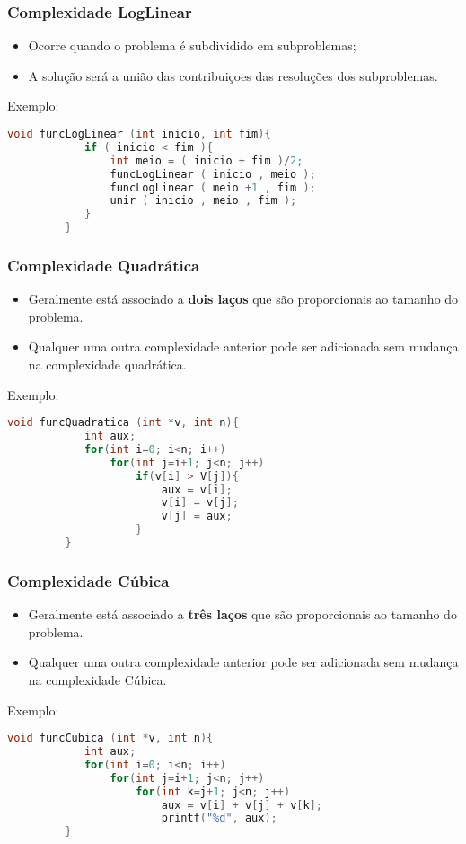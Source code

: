 \documentclass[10pt]{beamer}
\begin{document}
\begin{frame}[fragile, t]
    \frametitle{Complexidade LogLinear}
    \begin{itemize}
        \item Ocorre quando o problema é subdividido em subproblemas;
        \item A solução será a união das contribuiçoes das resoluções dos subproblemas.
    \end{itemize}
    \pause Exemplo:
    \begin{lstlisting}[language=C++, basicstyle=\small]
        void funcLogLinear (int inicio, int fim){
            if ( inicio < fim ){
                int meio = ( inicio + fim )/2;
                funcLogLinear ( inicio , meio );
                funcLogLinear ( meio +1 , fim );
                unir ( inicio , meio , fim );
            }
         }
    \end{lstlisting}

\end{frame}
\begin{frame}[fragile, t]
    \frametitle{Complexidade Quadrática}
    \begin{itemize}
        \item Geralmente está associado a \textbf{dois laços} que são proporcionais ao tamanho do problema.
        \item Qualquer uma outra complexidade anterior pode ser adicionada sem mudança na complexidade quadrática.
    \end{itemize}
    \pause Exemplo:
    \begin{lstlisting}[language=C++, basicstyle=\small]
        void funcQuadratica (int *v, int n){
            int aux;
            for(int i=0; i<n; i++)
                for(int j=i+1; j<n; j++)
                    if(v[i] > V[j]){
                        aux = v[i];
                        v[i] = v[j];
                        v[j] = aux;
                    }
         }
    \end{lstlisting}

\end{frame}

\begin{frame}[fragile, t]
    \frametitle{Complexidade Cúbica}
    \begin{itemize}
        \item Geralmente está associado a \textbf{três laços} que são proporcionais ao tamanho do problema.
        \item Qualquer uma outra complexidade anterior pode ser adicionada sem mudança na complexidade Cúbica.
    \end{itemize}
    \pause Exemplo:
    \begin{lstlisting}[language=C++, basicstyle=\small]
        void funcCubica (int *v, int n){
            int aux;
            for(int i=0; i<n; i++)
                for(int j=i+1; j<n; j++)
                    for(int k=j+1; j<n; j++)
                        aux = v[i] + v[j] + v[k];
                        printf("%d", aux);
         }
    \end{lstlisting}

\end{frame}
\end{document}
